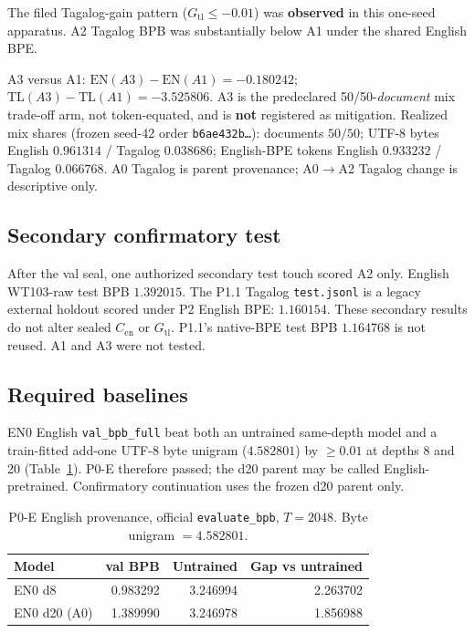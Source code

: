 \documentclass[11pt,a4paper]{article}
\begin{document}
The filed Tagalog-gain pattern ($G_{\mathrm{tl}}\le -0.01$) was \textbf{observed} in this one-seed apparatus. A2 Tagalog BPB was substantially below A1 under the shared English BPE.

A3 versus A1: $\mathrm{EN}(A3)-\mathrm{EN}(A1)=-0.180242$; $\mathrm{TL}(A3)-\mathrm{TL}(A1)=-3.525806$. A3 is the predeclared 50/50-\emph{document} mix trade-off arm, not token-equated, and is \textbf{not} registered as mitigation. Realized mix shares (frozen seed-42 order \texttt{b6ae432b\ldots}): documents $50/50$; UTF-8 bytes English $0.961314$ / Tagalog $0.038686$; English-BPE tokens English $0.933232$ / Tagalog $0.066768$. A0 Tagalog is parent provenance; A0$\rightarrow$A2 Tagalog change is descriptive only.

\subsection{Secondary confirmatory test}
After the val seal, one authorized secondary test touch scored A2 only. English WT103-raw test BPB $1.392015$. The P1.1 Tagalog \texttt{test.jsonl} is a legacy external holdout scored under P2 English BPE: $1.160154$. These secondary results do not alter sealed $C_{\mathrm{en}}$ or $G_{\mathrm{tl}}$. P1.1's native-BPE test BPB $1.164768$ is not reused. A1 and A3 were not tested.

\subsection{Required baselines}
EN0 English \texttt{val\_bpb\_full} beat both an untrained same-depth model and a train-fitted add-one UTF-8 byte unigram ($4.582801$) by $\ge 0.01$ at depths 8 and 20 (Table~\ref{tab:p0e}). P0-E therefore passed; the d20 parent may be called English-pretrained. Confirmatory continuation uses the frozen d20 parent only.

\begin{table}[t]
\centering
\caption{P0-E English provenance, official \texttt{evaluate\_bpb}, $T=2048$. Byte unigram $=4.582801$.}
\label{tab:p0e}
\begin{tabular}{lrrr}
\toprule
Model & val BPB & Untrained & Gap vs untrained \\
\midrule
EN0 d8 & 0.983292 & 3.246994 & 2.263702 \\
EN0 d20 (A0) & 1.389990 & 3.246978 & 1.856988 \\
\bottomrule
\end{tabular}
\end{table}
\end{document}
